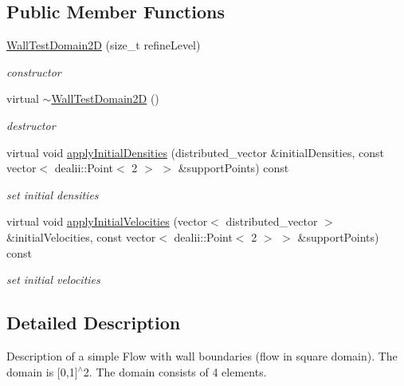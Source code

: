 \subsection*{Public Member Functions}
\begin{DoxyCompactItemize}
\item 
\hyperlink{classWallTestDomain2D_ae2a5588bd00b23f67587f5030520daca}{Wall\-Test\-Domain2\-D} (size\-\_\-t refine\-Level)
\begin{DoxyCompactList}\small\item\em constructor \end{DoxyCompactList}\item 
\hypertarget{classWallTestDomain2D_af086a6015fed51c4e1bd14e39fa52971}{virtual \hyperlink{classWallTestDomain2D_af086a6015fed51c4e1bd14e39fa52971}{$\sim$\-Wall\-Test\-Domain2\-D} ()}\label{classWallTestDomain2D_af086a6015fed51c4e1bd14e39fa52971}

\begin{DoxyCompactList}\small\item\em destructor \end{DoxyCompactList}\item 
virtual void \hyperlink{classWallTestDomain2D_a725e16638909ea1474033723eb47d7db}{apply\-Initial\-Densities} (distributed\-\_\-vector \&initial\-Densities, const vector$<$ dealii\-::\-Point$<$ 2 $>$ $>$ \&support\-Points) const 
\begin{DoxyCompactList}\small\item\em set initial densities \end{DoxyCompactList}\item 
virtual void \hyperlink{classWallTestDomain2D_a18698926c1b06762119e4b1ec6f865df}{apply\-Initial\-Velocities} (vector$<$ distributed\-\_\-vector $>$ \&initial\-Velocities, const vector$<$ dealii\-::\-Point$<$ 2 $>$ $>$ \&support\-Points) const 
\begin{DoxyCompactList}\small\item\em set initial velocities \end{DoxyCompactList}\end{DoxyCompactItemize}


\subsection{Detailed Description}
Description of a simple Flow with wall boundaries (flow in square domain). The domain is \mbox{[}0,1\mbox{]}$^\wedge$2. The domain consists of 4 elements. 

